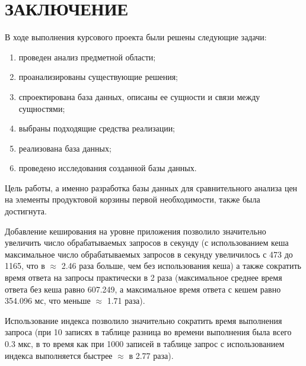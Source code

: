 \chapter*{ЗАКЛЮЧЕНИЕ}

В ходе выполнения курсового проекта были решены следующие задачи: 

\begin{enumerate}[label={\arabic*)}]
	\item проведен анализ предметной области;
	\item проанализированы существующие решения;
	\item спроектирована база данных, описаны ее сущности и связи между сущностями;
	\item выбраны подходящие средства реализации;
	\item реализована база данных;
	\item проведено исследования созданной базы данных.
\end{enumerate}

Цель работы, а именно разработка базы данных для сравнительного анализа цен на элементы продуктовой корзины первой необходимости, также была достигнута.

Добавление кеширования на уровне приложения позволило значительно увеличить число обрабатываемых запросов в секунду (с использованием кеша максимальное число обрабатываемых запросов в секунду увеличилось с 473 до 1165, что в $\approx$ 2.46 раза больше, чем без использования кеша) а также сократить время ответа на запросы практически в 2 раза (максимальное среднее время ответа без кеша равно 607.249, а максимальное время ответа с кешем равно 354.096 мс, что меньше $\approx$ 1.71 раза).

Использование индекса позволило значительно сократить время выполнения запроса (при 10 записях в таблице разница во времени выполнения была всего 0.3 мкс, в то время как при 1000 записей в таблице запрос с использованием индекса выполняется быстрее $\approx$ в 2.77 раза).